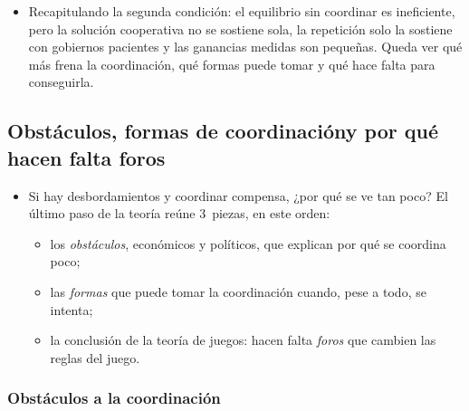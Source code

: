 \documentclass[11pt]{article}
\begin{document}
\begin{itemize}
\item Recapitulando la segunda condición: el equilibrio sin coordinar es ineficiente, pero la solución cooperativa no se sostiene sola, la repetición solo la sostiene con gobiernos pacientes y las ganancias medidas son pequeñas. Queda ver qué más frena la coordinación, qué formas puede tomar y qué hace falta para conseguirla.
\end{itemize}

\subsection{Obstáculos, formas de coordinación\cortetitulo y por qué hacen falta foros}\label{sec:obstaculos-foros}

\begin{itemize}
\item Si hay desbordamientos y coordinar compensa, ¿por qué se ve tan poco? El último paso de la teoría reúne 3~piezas, en este orden:
  \begin{itemize}
  \item los \emph{obstáculos}, económicos y políticos, que explican por qué se coordina poco;
  \item las \emph{formas} que puede tomar la coordinación cuando, pese a todo, se intenta;
  \item la conclusión de la teoría de juegos: hacen falta \emph{foros} que cambien las reglas del juego.
  \end{itemize}
\end{itemize}

\subsubsection{Obstáculos a la coordinación}\label{sec:obstaculos}
\end{document}
